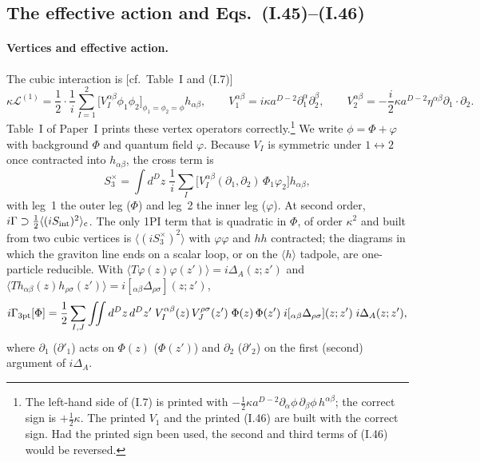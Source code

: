 \documentclass[aps,prd,onecolumn,10pt,nofootinbib,floatfix]{revtex4-2}
\newcommand{\PI}{Paper~I}
\newcommand{\eqI}[1]{(I.#1)}
\begin{document}
\subsection{The effective action and Eqs.~(I.45)--(I.46)}
\label{sec:s4a:setup}

\paragraph*{Vertices and effective action.}
The cubic interaction is [cf.\ Table~I and \eqI{7}]
\begin{equation}
\kappa\mathcal L^{(1)}=\frac12\cdot\frac1i\sum_{I=1}^2\Big[V_I^{\alpha\beta}\phi_1\phi_2\Big]_{\phi_1=\phi_2=\phi}h_{\alpha\beta},
\qquad
V_1^{\alpha\beta}=i\kappa a^{D-2}\partial_1^\alpha\partial_2^\beta,\qquad
V_2^{\alpha\beta}=-\frac i2\kappa a^{D-2}\eta^{\alpha\beta}\partial_1\!\cdot\partial_2 .
\label{eq:s4a:vertices}
\end{equation}
Table~I of \PI{} prints these vertex operators correctly.\footnote{The left-hand side of \eqI{7} is
printed with $-\tfrac12\kappa a^{D-2}\partial_\alpha\phi\,\partial_\beta\phi\,h^{\alpha\beta}$; the correct sign is
$+\tfrac12\kappa$. The printed $V_1$ and the printed \eqI{46} are built with the correct sign. Had the
printed sign been used, the second and third terms of \eqI{46} would be reversed.}
We write $\phi=\Phi+\varphi$ with background $\Phi$ and quantum field $\varphi$. Because $V_I$ is
symmetric under $1\leftrightarrow2$ once contracted into $h_{\alpha\beta}$, the cross term is
\begin{equation}
S_3^\times=\int d^Dz\;\frac1i\sum_I\big[V_I^{\alpha\beta}(\partial_1,\partial_2)\,\Phi_1\varphi_2\big]h_{\alpha\beta},
\label{eq:s4a:cross}
\end{equation}
with leg~1 the outer leg ($\Phi$) and leg~2 the inner leg ($\varphi$). At second order,
$i\Gamma\supset\frac12\langle(iS_{\rm int})^2\rangle_{\rm c}$. The only 1PI term that is quadratic in
$\Phi$, of order $\kappa^2$ and built from two cubic vertices is $\langle(iS_3^\times)^2\rangle$ with
$\varphi\varphi$ and $hh$ contracted; the diagrams in which the graviton line ends on a scalar loop,
or on the $\langle h\rangle$ tadpole, are one-particle reducible. With
$\langle T\varphi(z)\varphi(z')\rangle=i\Delta_A(z;z')$ and
$\langle Th_{\alpha\beta}(z)h_{\rho\sigma}(z')\rangle=i[{}_{\alpha\beta}\Delta_{\rho\sigma}](z;z')$,
\begin{equation}
i\Gamma_{\rm 3pt}[\Phi]=\frac12\sum_{I,J}\iint d^Dz\,d^Dz'\;V_I^{\alpha\beta}(z)\,V_J^{\rho\sigma}(z')\;
\Phi(z)\,\Phi(z')\;i[{}_{\alpha\beta}\Delta_{\rho\sigma}](z;z')\;i\Delta_A(z;z'),
\label{eq:s4a:Gamma3}
\end{equation}
where $\partial_1$ ($\partial'_1$) acts on $\Phi(z)$ ($\Phi(z')$) and $\partial_2$ ($\partial'_2$) on the first
(second) argument of $i\Delta_A$.
\end{document}
